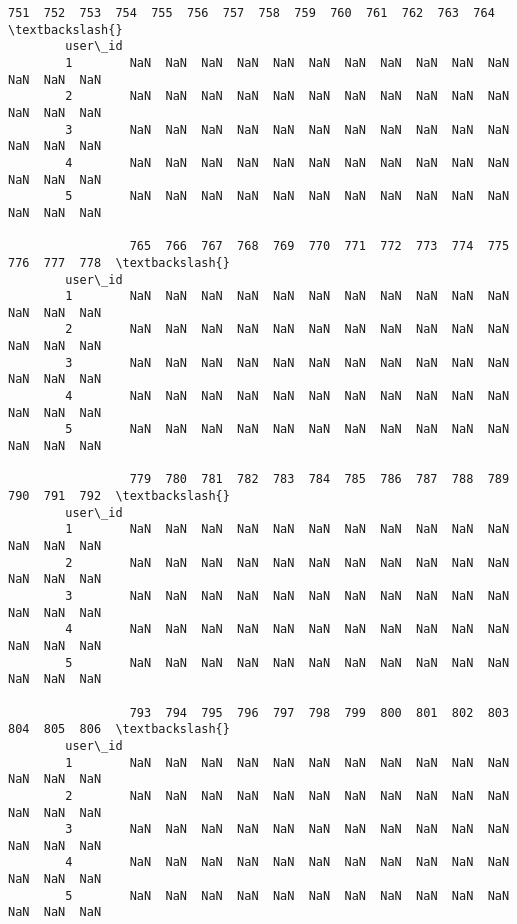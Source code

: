 \documentclass[11pt]{article}
\begin{document}
\begin{Verbatim}[commandchars=\\\{\}]
                 751  752  753  754  755  756  757  758  759  760  761  762  763  764  \textbackslash{}
        user\_id                                                                         
        1        NaN  NaN  NaN  NaN  NaN  NaN  NaN  NaN  NaN  NaN  NaN  NaN  NaN  NaN   
        2        NaN  NaN  NaN  NaN  NaN  NaN  NaN  NaN  NaN  NaN  NaN  NaN  NaN  NaN   
        3        NaN  NaN  NaN  NaN  NaN  NaN  NaN  NaN  NaN  NaN  NaN  NaN  NaN  NaN   
        4        NaN  NaN  NaN  NaN  NaN  NaN  NaN  NaN  NaN  NaN  NaN  NaN  NaN  NaN   
        5        NaN  NaN  NaN  NaN  NaN  NaN  NaN  NaN  NaN  NaN  NaN  NaN  NaN  NaN   
        
                 765  766  767  768  769  770  771  772  773  774  775  776  777  778  \textbackslash{}
        user\_id                                                                         
        1        NaN  NaN  NaN  NaN  NaN  NaN  NaN  NaN  NaN  NaN  NaN  NaN  NaN  NaN   
        2        NaN  NaN  NaN  NaN  NaN  NaN  NaN  NaN  NaN  NaN  NaN  NaN  NaN  NaN   
        3        NaN  NaN  NaN  NaN  NaN  NaN  NaN  NaN  NaN  NaN  NaN  NaN  NaN  NaN   
        4        NaN  NaN  NaN  NaN  NaN  NaN  NaN  NaN  NaN  NaN  NaN  NaN  NaN  NaN   
        5        NaN  NaN  NaN  NaN  NaN  NaN  NaN  NaN  NaN  NaN  NaN  NaN  NaN  NaN   
        
                 779  780  781  782  783  784  785  786  787  788  789  790  791  792  \textbackslash{}
        user\_id                                                                         
        1        NaN  NaN  NaN  NaN  NaN  NaN  NaN  NaN  NaN  NaN  NaN  NaN  NaN  NaN   
        2        NaN  NaN  NaN  NaN  NaN  NaN  NaN  NaN  NaN  NaN  NaN  NaN  NaN  NaN   
        3        NaN  NaN  NaN  NaN  NaN  NaN  NaN  NaN  NaN  NaN  NaN  NaN  NaN  NaN   
        4        NaN  NaN  NaN  NaN  NaN  NaN  NaN  NaN  NaN  NaN  NaN  NaN  NaN  NaN   
        5        NaN  NaN  NaN  NaN  NaN  NaN  NaN  NaN  NaN  NaN  NaN  NaN  NaN  NaN   
        
                 793  794  795  796  797  798  799  800  801  802  803  804  805  806  \textbackslash{}
        user\_id                                                                         
        1        NaN  NaN  NaN  NaN  NaN  NaN  NaN  NaN  NaN  NaN  NaN  NaN  NaN  NaN   
        2        NaN  NaN  NaN  NaN  NaN  NaN  NaN  NaN  NaN  NaN  NaN  NaN  NaN  NaN   
        3        NaN  NaN  NaN  NaN  NaN  NaN  NaN  NaN  NaN  NaN  NaN  NaN  NaN  NaN   
        4        NaN  NaN  NaN  NaN  NaN  NaN  NaN  NaN  NaN  NaN  NaN  NaN  NaN  NaN   
        5        NaN  NaN  NaN  NaN  NaN  NaN  NaN  NaN  NaN  NaN  NaN  NaN  NaN  NaN   
        

\end{Verbatim}
\end{document}
